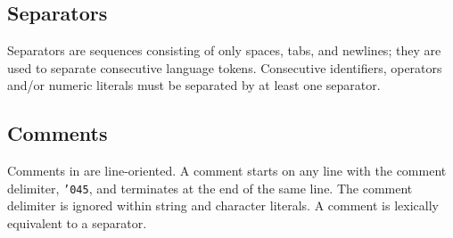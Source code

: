 \subsection{Separators}
Separators are sequences consisting of only spaces, tabs, and newlines; they
are used to separate consecutive language tokens.
Consecutive identifiers, operators  and/or numeric literals must be separated 
by at least one separator.

\subsection{Comments}
Comments in \emd{} are line-oriented. A comment starts on any
line with the comment
delimiter, {\tt \char '045}, and terminates at the end of the same line. The comment
delimiter is ignored within string and character literals.
A comment is lexically equivalent to a separator.
